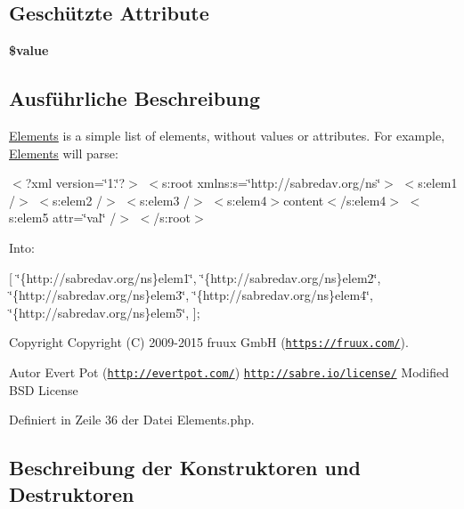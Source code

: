 \subsection*{Geschützte Attribute}
\begin{DoxyCompactItemize}
\item 
\mbox{\label{class_sabre_1_1_xml_1_1_element_1_1_elements_a2b36fa685c8046cbcdcd2ca2ccd5dd2a}} 
{\bfseries \$value}
\end{DoxyCompactItemize}


\subsection{Ausführliche Beschreibung}
\textquotesingle{}\mbox{\hyperlink{class_sabre_1_1_xml_1_1_element_1_1_elements}{Elements}}\textquotesingle{} is a simple list of elements, without values or attributes. For example, \mbox{\hyperlink{class_sabre_1_1_xml_1_1_element_1_1_elements}{Elements}} will parse\+:

$<$?xml version=\char`\"{}1.\char`\"{}?$>$ $<$s\+:root xmlns\+:s=\char`\"{}http\+://sabredav.\+org/ns\char`\"{}$>$ $<$s\+:elem1 /$>$ $<$s\+:elem2 /$>$ $<$s\+:elem3 /$>$ $<$s\+:elem4$>$content$<$/s\+:elem4$>$ $<$s\+:elem5 attr=\char`\"{}val\char`\"{} /$>$ $<$/s\+:root$>$

Into\+:

\mbox{[} \char`\"{}\{http\+://sabredav.\+org/ns\}elem1\char`\"{}, \char`\"{}\{http\+://sabredav.\+org/ns\}elem2\char`\"{}, \char`\"{}\{http\+://sabredav.\+org/ns\}elem3\char`\"{}, \char`\"{}\{http\+://sabredav.\+org/ns\}elem4\char`\"{}, \char`\"{}\{http\+://sabredav.\+org/ns\}elem5\char`\"{}, \mbox{]};

\begin{DoxyCopyright}{Copyright}
Copyright (C) 2009-\/2015 fruux GmbH (\href{https://fruux.com/}{\tt https\+://fruux.\+com/}). 
\end{DoxyCopyright}
\begin{DoxyAuthor}{Autor}
Evert Pot (\href{http://evertpot.com/}{\tt http\+://evertpot.\+com/})  \href{http://sabre.io/license/}{\tt http\+://sabre.\+io/license/} Modified B\+SD License 
\end{DoxyAuthor}


Definiert in Zeile 36 der Datei Elements.\+php.



\subsection{Beschreibung der Konstruktoren und Destruktoren}
\mbox{\label{class_sabre_1_1_xml_1_1_element_1_1_elements_aa0d6612f1e1b7818faf4ef3d794f7558}} 
